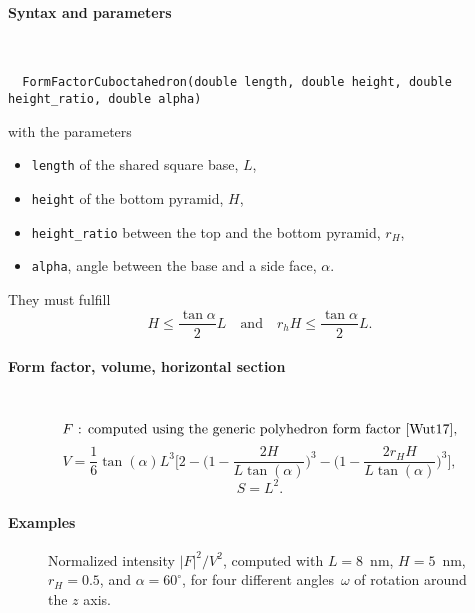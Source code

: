 \FloatBarrier

\paragraph{Syntax and parameters}\strut\\[-2ex plus .2ex minus .2ex]
\begin{lstlisting}
  FormFactorCuboctahedron(double length, double height, double height_ratio, double alpha)
\end{lstlisting}
with the parameters
\begin{itemize}
\item \texttt{length} of the shared square base, $L$,
\item \texttt{height} of the bottom pyramid, $H$,
\item \texttt{height\_ratio} between the top and the bottom pyramid, $r_H$,
\item \texttt{alpha}, angle between the base and a side face, $\alpha$.
\end{itemize}
They must fulfill
\begin{displaymath}
  H \le \frac{\tan\alpha}{2} L
  \quad\text{and}\quad
  r_h H \le \frac{\tan\alpha}{2} L.
\end{displaymath}

\paragraph{Form factor, volume, horizontal section}\strut\\
\begin{equation*}
  F \text{~: computed using the generic polyhedron form factor~\cite{Wut17},}
\end{equation*}
\begin{equation*}
  V= \dfrac{1}{6} \tan(\alpha)L^3 \Big[ 2
         - \Big(1 - \dfrac{2H }{L\tan(\alpha)} \Big)^3
           - \Big(1 - \dfrac{2 r_H
             H}{L\tan(\alpha) }\Big)^3\Big],
\end{equation*}
\begin{equation*}
  S =L^2.
\end{equation*}

\paragraph{Examples}\strut

\begin{figure}[H]
\begin{center}
\end{center}
\caption{Normalized intensity $|F|^2/V^2$,
computed with $L=8$~nm, $H=5$~nm, $r_H=0.5$, and $\alpha=60^\circ$,
for four different angles~$\omega$ of rotation around the $z$ axis.}
\end{figure}


